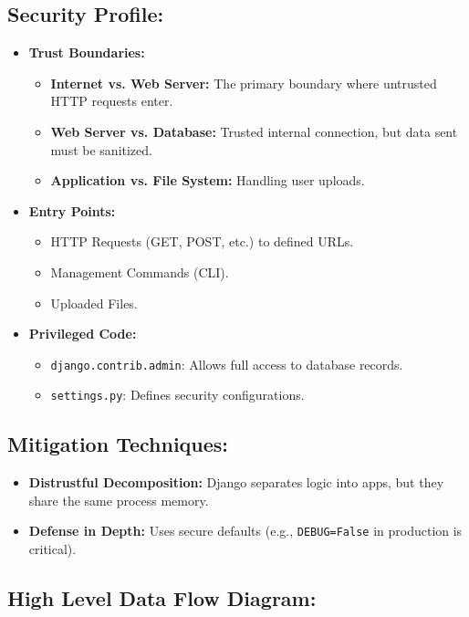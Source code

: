 \documentclass[10pt,a4paper]{article}
\begin{document}
\subsection*{Security Profile:}
\begin{itemize}
    \item \textbf{Trust Boundaries:}
    \begin{itemize}
        \item \textbf{Internet vs. Web Server:} The primary boundary where untrusted HTTP requests enter.
        \item \textbf{Web Server vs. Database:} Trusted internal connection, but data sent must be sanitized.
        \item \textbf{Application vs. File System:} Handling user uploads.
    \end{itemize}
    \item \textbf{Entry Points:}
    \begin{itemize}
        \item HTTP Requests (GET, POST, etc.) to defined URLs.
        \item Management Commands (CLI).
        \item Uploaded Files.
    \end{itemize}
    \item \textbf{Privileged Code:}
    \begin{itemize}
        \item \texttt{django.contrib.admin}: Allows full access to database records.
        \item \texttt{settings.py}: Defines security configurations.
    \end{itemize}
\end{itemize}

\subsection*{Mitigation Techniques:}
\begin{itemize}
    \item \textbf{Distrustful Decomposition:} Django separates logic into apps, but they share the same process memory.
    \item \textbf{Defense in Depth:} Uses secure defaults (e.g., \texttt{DEBUG=False} in production is critical).
\end{itemize}

\subsection*{High Level Data Flow Diagram:}
\end{document}
